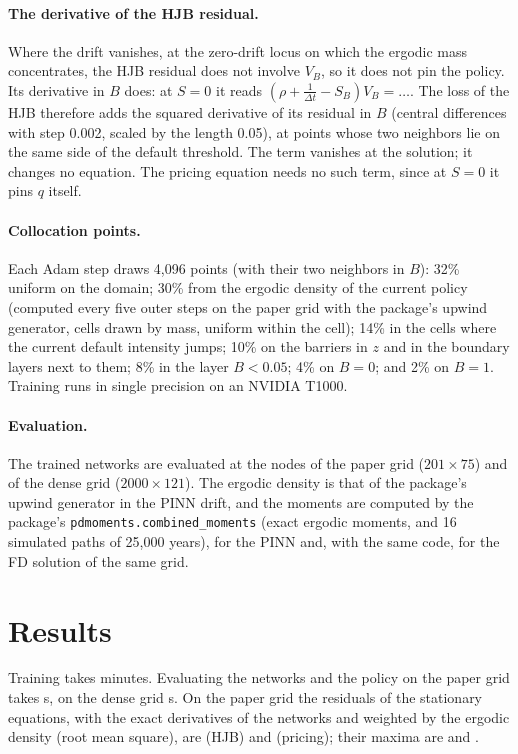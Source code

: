 \documentclass[11pt]{article}
\begin{document}
\paragraph{The derivative of the HJB residual.} Where the drift vanishes, at the zero-drift locus on which the ergodic
mass concentrates, the HJB residual does not involve $V_B$, so it does not pin the policy. Its derivative in $B$ does:
at $S=0$ it reads $(\rho+\frac1{\Delta t}-S_B)V_B=\dots$. The loss of the HJB therefore adds the squared derivative of
its residual in $B$ (central differences with step 0.002, scaled by the length 0.05), at points whose two neighbors lie
on the same side of the default threshold. The term vanishes at the solution; it changes no equation. The pricing
equation needs no such term, since at $S=0$ it pins $q$ itself.

\paragraph{Collocation points.} Each Adam step draws 4,096 points (with their two neighbors in $B$): 32\% uniform on
the domain; 30\% from the ergodic density of the current policy (computed every five outer steps on the paper grid with
the package's upwind generator, cells drawn by mass, uniform within the cell); 14\% in the cells where the current
default intensity jumps; 10\% on the barriers in $z$ and in the boundary layers next to them; 8\% in the layer
$B<0.05$; 4\% on $B=0$; and 2\% on $B=1$. Training runs in single precision on an NVIDIA T1000.

\paragraph{Evaluation.} The trained networks are evaluated at the nodes of the paper grid ($201\times75$) and of the
dense grid ($2000\times121$). The ergodic density is that of the package's upwind generator in the PINN drift, and
the moments are computed by the package's \texttt{pdmoments.combined\_moments} (exact ergodic moments, and 16
simulated paths of 25,000 years), for the PINN and, with the same code, for the FD solution of the same grid.

\section{Results}

Training takes \trainmin{} minutes. Evaluating the networks and the policy on the paper grid takes \evalpaper{} s, on
the dense grid \evaldense{} s. On the paper grid the residuals of the stationary equations, with the exact derivatives of
the networks and weighted by the ergodic density (root mean square), are \resV{} (HJB) and \resq{} (pricing); their
maxima are \resVmax{} and \resqmax.
\end{document}
